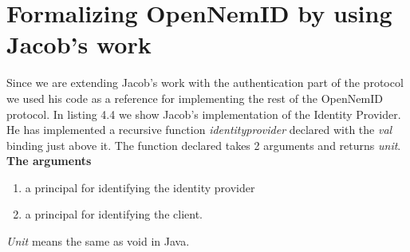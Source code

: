 \documentclass[twosided]{report}
\begin{document}
\section{Formalizing OpenNemID by using Jacob's work}
Since we are extending Jacob's work with the authentication part of the protocol we used his code as a reference for implementing the rest of the OpenNemID protocol. In listing 4.4 we show Jacob's implementation of the Identity Provider. He has implemented a recursive function \emph{identityprovider} declared with the \emph{val} binding just above it. The function declared takes 2 arguments and returns \emph{unit}.\\
\textbf{The arguments}
\begin{enumerate}
\item a principal for identifying the identity provider
\item a principal for identifying the client.
\end{enumerate}
\emph{Unit} means the same as void in Java.
\end{document}
